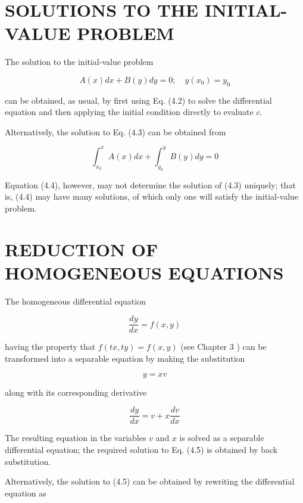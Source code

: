 \documentclass[10pt]{article}
\begin{document}
\section*{SOLUTIONS TO THE INITIAL-VALUE PROBLEM}
The solution to the initial-value problem


\begin{equation*}
A(x) d x+B(y) d y=0 ; \quad y\left(x_{0}\right)=y_{0} \tag{4.3}
\end{equation*}


can be obtained, as usual, by first using Eq. (4.2) to solve the differential equation and then applying the initial condition directly to evaluate $c$.

Alternatively, the solution to Eq. (4.3) can be obtained from


\begin{equation*}
\int_{x_{0}}^{x} A(x) d x+\int_{y_{0}}^{y} B(y) d y=0 \tag{4.4}
\end{equation*}


Equation (4.4), however, may not determine the solution of (4.3) uniquely; that is, (4.4) may have many solutions, of which only one will satisfy the initial-value problem.

\section*{REDUCTION OF HOMOGENEOUS EQUATIONS}
The homogeneous differential equation


\begin{equation*}
\frac{d y}{d x}=f(x, y) \tag{4.5}
\end{equation*}


having the property that $f(t x, t y)=f(x, y)$ (see Chapter 3 ) can be transformed into a separable equation by making the substitution


\begin{equation*}
y=x v \tag{4.6}
\end{equation*}


along with its corresponding derivative


\begin{equation*}
\frac{d y}{d x}=v+x \frac{d v}{d x} \tag{4.7}
\end{equation*}


The resulting equation in the variables $v$ and $x$ is solved as a separable differential equation; the required solution to Eq. (4.5) is obtained by back substitution.

Alternatively, the solution to (4.5) can be obtained by rewriting the differential equation as
\end{document}
